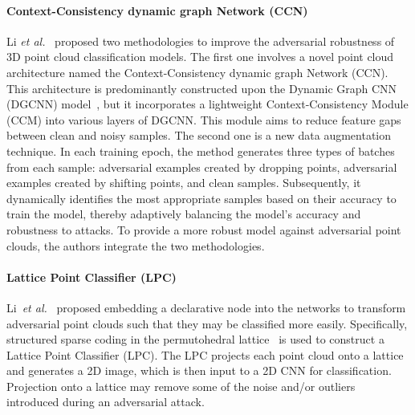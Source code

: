 \documentclass{ieeeaccess}
\def\etal{\textit{et al.}}
\begin{document}
\paragraph{Context-Consistency dynamic graph Network (CCN)}
\label{sec:Context-Consistency dynamic graph Network}
Li \etal~\cite{li2022improving} proposed two methodologies to improve the adversarial robustness of 3D point cloud classification models. 
The first one involves a novel point cloud architecture named the Context-Consistency dynamic graph Network (CCN). This architecture is predominantly constructed upon the Dynamic Graph CNN (DGCNN) model~\cite{wang2019dynamic}, but it incorporates a lightweight Context-Consistency Module (CCM) into various layers of DGCNN. This module aims to reduce feature gaps between clean and noisy samples. 
The second one is a new data augmentation technique. In each training epoch, the method generates three types of batches from each sample: adversarial examples created by dropping points, adversarial examples created by shifting points, and clean samples. Subsequently, it dynamically identifies the most appropriate samples based on their accuracy to train the model, thereby adaptively balancing the model's accuracy and robustness to attacks.
To provide a more robust model against adversarial point clouds, the authors integrate the two methodologies.


\paragraph{Lattice Point Classifier (LPC)}
\label{sec:Lattice Point Classifier (LPC)}
Li~\etal~\cite{li2022robust} proposed embedding a declarative node into the networks to transform adversarial point clouds such that they may be classified more easily. %
Specifically, structured sparse coding in the permutohedral lattice~\cite{kiefel2015permutohedral} is used to construct a %
Lattice Point Classifier (LPC). The LPC projects each point cloud onto a lattice and generates a 2D image, which is then input to a 2D CNN for classification. %
Projection onto a lattice may %
remove some of the noise and/or outliers introduced during an adversarial attack.
\end{document}
